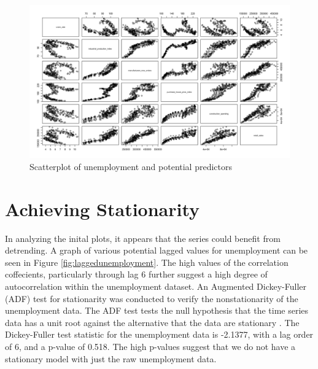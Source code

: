 \documentclass[twoside,twocolumn]{article}
\begin{document}
			\begin{figure}[H]
		\centering
		\caption{Scatterplot of unemployment and potential predictors}
		\label{fig:pred_scatt}
		\includegraphics[width=\linewidth]{images/pred_scatt}
	\end{figure}
	


\section{Achieving Stationarity}

In analyzing the inital plots, it appears that the series could benefit from detrending. A graph of various potential lagged values for unemployment can be seen in Figure \ref{fig:laggedunemployment}. The high values of the correlation coffecients, particularly through lag 6 further suggest a high degree of autocorrelation within the unemployment dataset.    An Augmented Dickey-Fuller (ADF) test for stationarity was conducted to verify the nonstationarity of the unemployment data.  The ADF test tests the null hypothesis that the time series data has a unit root against the alternative that the data are stationary \citep{Shumway2006}. The Dickey-Fuller test statistic for the unemployment data is -2.1377, with a lag order of 6, and a p-value of 0.518. The high p-values suggest that we do not have a stationary model with just the raw unemployment data.
			
\end{document}
